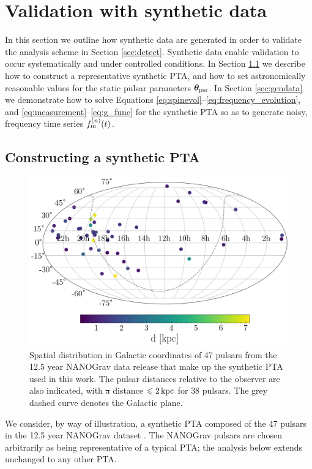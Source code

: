 \documentclass[fleqn,usenatbib,useAMS]{mnras}
\providecommand{\DIFadd}[1]{{\protect\color{blue}\uwave{#1}}} %
\providecommand{\DIFdel}[1]{{\protect\color{red}\sout{#1}}}                      %
\providecommand{\DIFaddbegin}{} %
\providecommand{\DIFaddend}{} %
\providecommand{\DIFdelbegin}{} %
\providecommand{\DIFdelend}{} %
\providecommand{\DIFdelFL}[1]{\DIFdel{#1}} %
\providecommand{\DIFdelbeginFL}{} %
\providecommand{\DIFdelendFL}{} %
\newcommand{\DIFscaledelfig}{0.5}
\newlength{\DIFdelgraphicswidth} %
\newlength{\DIFdelgraphicsheight} %
\newcommand{\DIFaddincludegraphics}[2][]{{\color{blue}\fbox{\DIFOincludegraphics[#1]{#2}}}} %
\newcommand{\DIFdelincludegraphics}[2][]{%
\sbox{\DIFdelgraphicsbox}{\DIFOincludegraphics[#1]{#2}}%
\settoboxwidth{\DIFdelgraphicswidth}{\DIFdelgraphicsbox} %
\settoboxtotalheight{\DIFdelgraphicsheight}{\DIFdelgraphicsbox} %
\scalebox{\DIFscaledelfig}{%
\parbox[b]{\DIFdelgraphicswidth}{\usebox{\DIFdelgraphicsbox}\\[-\baselineskip] \rule{\DIFdelgraphicswidth}{0em}}\llap{\resizebox{\DIFdelgraphicswidth}{\DIFdelgraphicsheight}{%
\setlength{\unitlength}{\DIFdelgraphicswidth}%
\begin{picture}(1,1)%
\thicklines\linethickness{2pt} %
{\color[rgb]{1,0,0}\put(0,0){\framebox(1,1){}}}%
{\color[rgb]{1,0,0}\put(0,0){\line( 1,1){1}}}%
{\color[rgb]{1,0,0}\put(0,1){\line(1,-1){1}}}%
\end{picture}%
}\hspace*{3pt}}} %
} %
\DeclareRobustCommand{\DIFaddbegin}{\DIFOaddbegin \let\includegraphics\DIFaddincludegraphics} %
\DeclareRobustCommand{\DIFaddend}{\DIFOaddend \let\includegraphics\DIFOincludegraphics} %
\DeclareRobustCommand{\DIFdelbegin}{\DIFOdelbegin \let\includegraphics\DIFdelincludegraphics} %
\DeclareRobustCommand{\DIFdelend}{\DIFOaddend \let\includegraphics\DIFOincludegraphics} %
\DeclareRobustCommand{\DIFdelbeginFL}{\DIFOdelbeginFL \let\includegraphics\DIFdelincludegraphics} %
\DeclareRobustCommand{\DIFdelendFL}{\DIFOaddendFL \let\includegraphics\DIFOincludegraphics} %
\begin{document}
\section{Validation with synthetic data} \label{sec:testing}
In this section we outline how synthetic data are generated in order to validate the analysis scheme in Section \ref{sec:detect}. Synthetic data enable validation to occur systematically and under controlled conditions. In Section \ref{sec:synt_pta} we describe how to construct a representative synthetic PTA, and how to set astronomically reasonable values for the static pulsar parameters $\boldsymbol{\theta}_{\rm psr}$. In Section \ref{sec:gendata} we demonstrate how to solve Equations \eqref{eq:spinevol}--\eqref{eq:frequency_evolution}, and \eqref{eq:measurement}--\eqref{eq:g_func} for the synthetic PTA so as to generate noisy, frequency time series \DIFdelbegin \DIFdel{$f_{\rm m}^{(n)}(t)$}\DIFdelend \DIFaddbegin \DIFadd{$f_{\rm m}^{(1)}(t), \dots, f_{\rm m}^{(N)}(t) $}\DIFaddend . 

\subsection{Constructing a synthetic PTA}\label{sec:synt_pta}
\begin{figure}
	\includegraphics[width=\columnwidth]{images/pulsar_distribution}
	\caption{Spatial distribution in Galactic coordinates of 47 pulsars from the 12.5 year NANOGrav data release that make up the synthetic PTA used in this work. The pulsar distances relative to the observer are also indicated, with \DIFdelbeginFL \DIFdelFL{a }\DIFdelendFL distance $\leq 2 \, {\rm kpc}$ for $38$ pulsars. The grey dashed curve denotes the Galactic plane.}
	\label{fig:pulsar_distrib}
\end{figure}
We consider, by way of illustration, a synthetic PTA composed of the 47 pulsars in the 12.5 year NANOGrav dataset \citep{2020ApJ...905L..34A}. The NANOGrav pulsars are chosen arbitrarily as being representative of a typical PTA; the analysis below extends unchanged to any other PTA. \newline 
\end{document}
